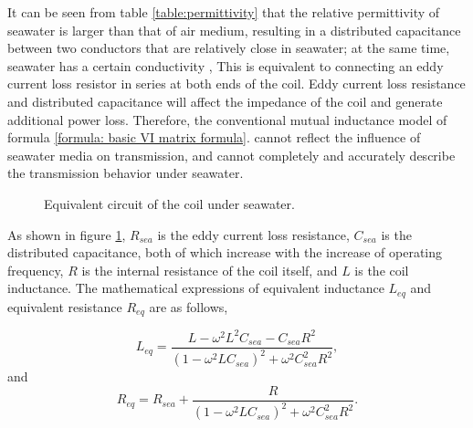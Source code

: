 It can be seen from table \ref{table:permittivity} that the relative permittivity of seawater is larger than that of air medium, resulting in a distributed capacitance between two conductors that are relatively close in seawater; at the same time, seawater has a certain conductivity , This is equivalent to connecting an eddy current loss resistor in series at both ends of the coil. Eddy current loss resistance and distributed capacitance will affect the impedance of the coil and generate additional power loss. Therefore, the conventional mutual inductance model of formula \ref{formula: basic VI matrix formula}. cannot reflect the influence of seawater media on transmission, and cannot completely and accurately describe the transmission behavior under seawater.


\begin{figure}[!t]
    \centering
    \caption{Equivalent circuit of the coil under seawater.}
    \label{fig:coil under seawater}
\end{figure}

As shown in figure \ref{fig:coil under seawater}, $R_{sea}$ is the eddy current loss resistance, $C_{sea}$ is the distributed capacitance, both of which increase with the increase of operating frequency, $R$ is the internal resistance of the coil itself, and $L$ is the coil inductance. The mathematical expressions of equivalent inductance $L_{eq}$ and equivalent resistance $R_{eq}$ are as follows,

\begin{equation}
    L_{eq} = \frac{L-\omega ^2 L^2C_{sea}- C_{sea}R^2}{(1-\omega ^2 LC_{sea})^2 + \omega^2C_{sea}^2R^2},
    \label{formula: Leq}
\end{equation}
and
\begin{equation}
    R_{eq} = R_{sea} + \frac{R}{(1-\omega^2LC_{sea})^2+\omega^2C_{sea}^2R^2}.
    \label{formula: Req}
\end{equation}

